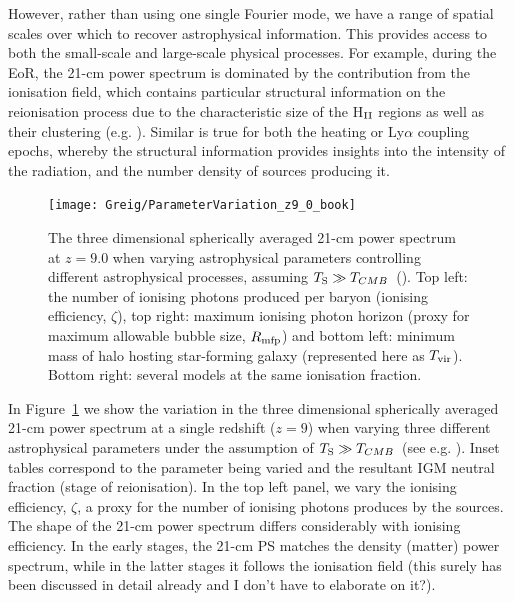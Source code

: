 However, rather than using one single Fourier mode, we have a range of spatial scales over which to recover astrophysical information. This provides access to both the small-scale and large-scale physical processes. For example, during the EoR, the 21-cm power spectrum is dominated by the contribution from the ionisation field, which contains particular structural information on the reionisation process due to the characteristic size of the H$_{\rm \scriptsize II}$ regions as well as their clustering (e.g. \cite{Lidz:2008}). Similar is true for both the heating or Ly$\alpha$ coupling epochs, whereby the structural information provides insights into the intensity of the radiation, and the number density of sources producing it.

\begin{figure}[]
\begin{center}
\texttt{[image: Greig/ParameterVariation\_z9\_0\_book]}
\end{center}
\caption{The three dimensional spherically averaged 21-cm power spectrum at $z=9.0$ when varying astrophysical parameters controlling different astrophysical processes, assuming $T_{\rm S} \gg T_{CMB}$~(\cite{Greig:2015}). Top left: the number of ionising photons produced per baryon (ionising efficiency, $\zeta$), top right: maximum ionising photon horizon (proxy for maximum allowable bubble size, $R_{\rm mfp}$) and bottom left: minimum mass of halo hosting star-forming galaxy (represented here as $T_{\rm vir}$). Bottom right: several models at the same ionisation fraction.}
\label{fig:PSvariation}
\end{figure}

In Figure~\ref{fig:PSvariation} we show the variation in the three dimensional spherically averaged 21-cm power spectrum at a single redshift ($z=9$) when varying three different astrophysical parameters under the assumption of $T_{\rm S} \gg T_{CMB}$~(see e.g. \cite{Greig:2015}). Inset tables correspond to the parameter being varied and the resultant IGM neutral fraction (stage of reionisation). In the top left panel, we vary the ionising efficiency, $\zeta$, a proxy for the number of ionising photons produces by the sources. The shape of the 21-cm power spectrum differs considerably with ionising efficiency. In the early stages, the 21-cm PS matches the density (matter) power spectrum, while in the latter stages it follows the ionisation field {\color{red} (this surely has been discussed in detail already and I don't have to elaborate on it?)}. 


